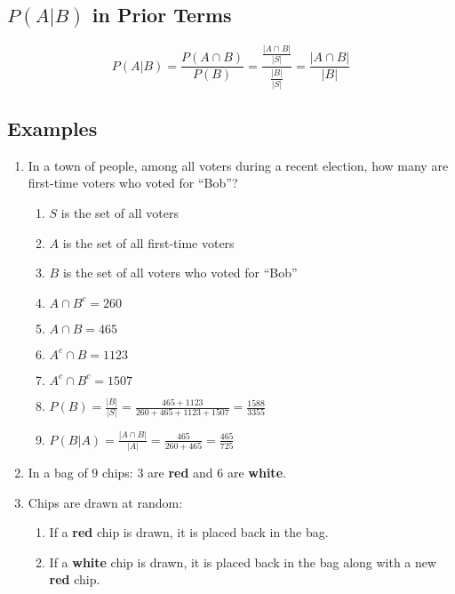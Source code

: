 \documentclass[12pt]{article}
\begin{document}
        \subsection{$P(A|B)$ in Prior Terms}
            \begin{equation}
                P(A|B) = \frac{P(A \cap B)}{P(B)} = \frac{\frac{|A \cap B|}{|S|}}{\frac{|B|}{|S|}} = \frac{|A \cap B|}{|B|}
            \end{equation}
        \subsection{Examples}
            \begin{enumerate}
                \item In a town of people, among all voters during a recent election, how many are first-time voters who voted for ``Bob''?
                \begin{enumerate}
                    \item $S$ is the set of all voters
                    \item $A$ is the set of all first-time voters
                    \item $B$ is the set of all voters who voted for ``Bob''
                    \item $A \cap B^c = 260$
                    \item $A \cap B = 465$ 
                    \item $A^c \cap B = 1123$
                    \item $A^c \cap B^c = 1507$
                    \item $P(B) = \frac{|B|}{|S|} = \frac{465 + 1123}{260 + 465 + 1123 + 1507} = \frac{1588}{3355}$
                    \item $P(B|A) = \frac{|A \cap B|}{|A|} = \frac{465}{260 + 465} = \frac{465}{725}$
                \end{enumerate}
                \item In a bag of $9$ chips: $3$ are \textbf{red} and $6$ are \textbf{white}.
                \item Chips are drawn at random:
                \begin{enumerate}
                    \item If a \textbf{red} chip is drawn, it is placed back in the bag.
                    \item If a \textbf{white} chip is drawn, it is placed back in the bag along with a new \textbf{red} chip.

\end{enumerate}
\end{enumerate}
\end{document}
